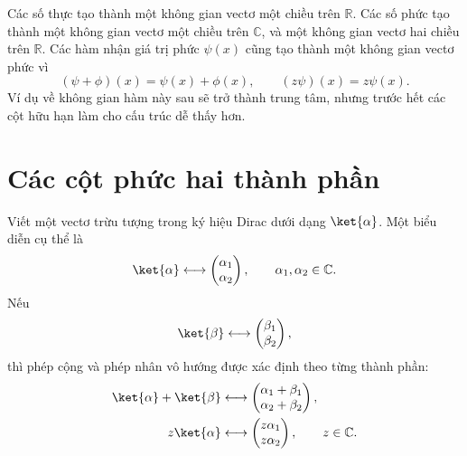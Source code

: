 Các số thực tạo thành một không gian vectơ một chiều trên \(\mathbb R\). Các số phức tạo thành một không gian vectơ một chiều trên \(\mathbb C\), và một không gian vectơ hai chiều trên \(\mathbb R\). Các hàm nhận giá trị phức \(\psi(x)\) cũng tạo thành một không gian vectơ phức vì
\begin{equation}
  (\psi+\phi)(x)=\psi(x)+\phi(x),
  \qquad
  (z\psi)(x)=z\psi(x).
\end{equation}
Ví dụ về không gian hàm này sau sẽ trở thành trung tâm, nhưng trước hết các cột hữu hạn làm cho cấu trúc dễ thấy hơn.

\begin{classroomqa}
\end{classroomqa}

\section{Các cột phức hai thành phần}

Viết một vectơ trừu tượng trong ký hiệu Dirac dưới dạng \(\ket{\alpha}\). Một biểu diễn cụ thể là
\begin{equation}
  \ket{\alpha}
  \longleftrightarrow
  \begin{pmatrix}
    \alpha_1\\
    \alpha_2
  \end{pmatrix},
  \qquad
  \alpha_1,\alpha_2\in\mathbb C.
\end{equation}
Nếu
\begin{equation}
  \ket{\beta}
  \longleftrightarrow
  \begin{pmatrix}
    \beta_1\\
    \beta_2
  \end{pmatrix},
\end{equation}
thì phép cộng và phép nhân vô hướng được xác định theo từng thành phần:
\begin{align}
  \ket{\alpha}+\ket{\beta}
  &\longleftrightarrow
  \begin{pmatrix}
    \alpha_1+\beta_1\\
    \alpha_2+\beta_2
  \end{pmatrix},\\
  z\ket{\alpha}
  &\longleftrightarrow
  \begin{pmatrix}
    z\alpha_1\\
    z\alpha_2
  \end{pmatrix},
  \qquad z\in\mathbb C.
\end{align}

